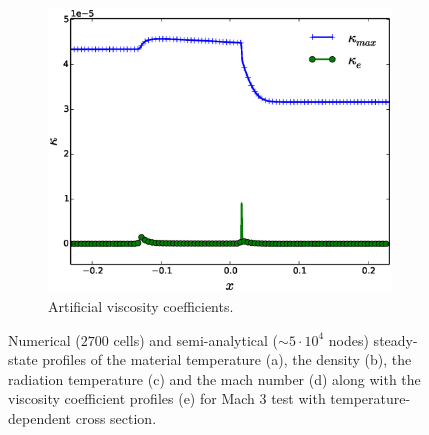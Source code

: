 \documentclass[times,doublespace]{fldauth}%
\begin{document}
\begin{figure}[h]
\begin{center}
    ~
    \begin{subfigure}{0.32\textwidth}
    \centering
    \includegraphics[width=\linewidth]{figures/dpt-xs/mass-diff-visc-nel-2700-plot.eps}
    \caption{Artificial viscosity coefficients.}\label{fig:mach-3-dpt-xs-visc}
    \end{subfigure}      
    \end{center}  
\caption{Numerical ($2700$ cells) and semi-analytical ($\sim 5 \cdot 10^4$ nodes) steady-state profiles of the material temperature (a), the density (b), the radiation temperature (c) and the mach number (d) along with the viscosity coefficient profiles (e) for Mach $3$ test with temperature-dependent cross section.}\label{fig:mach-3-temp-dep-xs}    
\end{figure}
%
\end{document}
